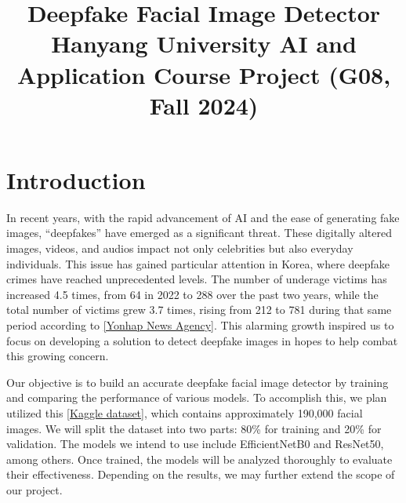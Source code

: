 \documentclass[conference]{IEEEtran}
\begin{document}
\title{Deepfake Facial Image Detector\\
{\large Hanyang University AI and Application Course Project (G08, Fall 2024)}}

\author{
\and
{}
\and
{}
\and
{}
}


\maketitle

\section*{Introduction}
In recent years, with the rapid advancement of AI and the ease of generating fake images, “deepfakes” have emerged as a significant threat. These digitally altered images, videos, and audios impact not only celebrities but also everyday individuals. This issue has gained particular attention in Korea, where deepfake crimes have reached unprecedented levels. The number of underage victims has increased 4.5 times, from 64 in 2022 to 288 over the past two years, while the total number of victims grew 3.7 times, rising from 212 to 781 during that same period according to \href{https://en.yna.co.kr/view/AEN20240828003100315}{[Yonhap News Agency]}. This alarming growth inspired us to focus on developing a solution to detect deepfake images in hopes to help combat this growing concern.

Our objective is to build an accurate deepfake facial image detector by training and comparing the performance of various models. To accomplish this, we plan utilized this \href{https://www.kaggle.com/datasets/manjilkarki/deepfake-and-real-images}{[Kaggle dataset]}, which contains approximately 190,000 facial images. We will split the dataset into two parts: 80\% for training and 20\% for validation. The models we intend to use include EfficientNetB0 and ResNet50, among others. Once trained, the models will be analyzed thoroughly to evaluate their effectiveness. Depending on the results, we may further extend the scope of our project.
\end{document}
